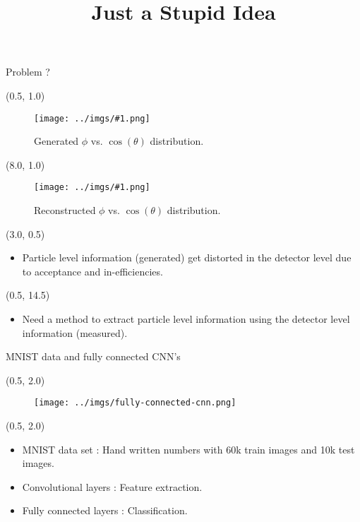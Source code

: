 \documentclass[10pt, xcolor={dvipsnames}, aspectratio = 169, sans,mathserif]{beamer}
\title{Just a Stupid Idea}
\newcommand{\leftpic}[2]
{
\begin{textblock}{7.0}(0.5, 1.0)
\begin{figure}
    \centering
    \texttt{[image: ../imgs/\#1.png]}
    \caption{#2}
\end{figure}
\end{textblock}
}
\newcommand{\rightpic}[2]
{
\begin{textblock}{7.0}(8.0, 1.0)
\begin{figure}
    \centering
    \texttt{[image: ../imgs/\#1.png]}
    \caption{#2}
\end{figure}
\end{textblock}
}
\begin{document}
\begin{frame}
    \maketitle
\end{frame}

\begin{frame}[fragile]{Problem ?}

\leftpic{phi_costh_mc}{Generated $\phi$ vs. $\cos(\theta)$ distribution.}

\rightpic{phi_costh}{Reconstructed $\phi$ vs. $\cos(\theta)$ distribution.}

\begin{textblock}{13.0}(3.0, 0.5)
\begin{itemize}
    \item Particle level information (generated) get distorted in the detector level due to acceptance and in-efficiencies.
\end{itemize}
\end{textblock}

\begin{textblock}{15.0}(0.5, 14.5)
\begin{itemize}
    \item Need a method to extract particle level information using the detector level information (measured).
\end{itemize}
\end{textblock}

\end{frame}

\begin{frame}{MNIST data and fully connected CNN's}

\begin{textblock}{14.0}(0.5, 2.0)
\begin{figure}
    \centering
    \texttt{[image: ../imgs/fully-connected-cnn.png]}
\end{figure}
\end{textblock}

\begin{textblock}{10.0}(0.5, 2.0)
\begin{itemize}

    \item MNIST data set : Hand written numbers with 60k train images and 10k test images.

    \item Convolutional layers : Feature extraction.

    \item Fully connected layers : Classification.
\end{itemize}
\end{textblock}

\end{frame}
\end{document}
